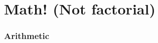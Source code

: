 \documentclass[11pt,a4paper,twoside]{article}
\begin{document}
%				
%				
%						
%					
%						
%					
%						
%					
%						
%					
%						
%					
%				
			
%		
%			
%			
%				
%					
%				
%					
%				
%			
			
\newpage
						
	\part{Math! (Not factorial) }
		
		\section{Arithmetic}
			
\end{document}
